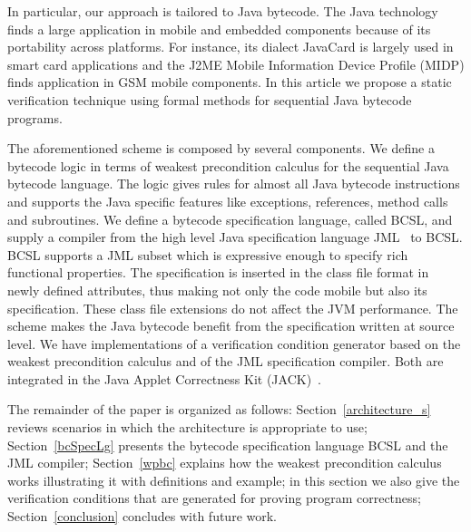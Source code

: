 
In particular, our approach is tailored to Java bytecode.
The Java technology finds a large application in mobile and embedded components because of its portability across platforms. 
For instance, its dialect JavaCard is largely used in smart card applications and the J2ME Mobile Information Device Profile (MIDP) finds application in GSM mobile components. 
In this article we propose a static verification technique using formal methods for sequential Java bytecode programs.

The aforementioned scheme is composed by several components.
We define a bytecode logic in terms of weakest precondition calculus for the sequential Java bytecode language. 
The logic gives rules for almost all Java bytecode instructions and supports the Java specific features like 
exceptions, references, method calls and subroutines.  
 We define a bytecode specification language, called BCSL, and supply a compiler from 
 the high level Java specification language JML~\cite{JMLRefMan} to BCSL. 
 BCSL supports a JML subset which is expressive enough to specify rich functional properties. The specification is 
 inserted in the class file format in newly defined attributes, thus making not only the code mobile but also its specification. These class
 file extensions do not affect the JVM performance. The scheme makes the Java bytecode benefit from the specification written at source level.
 We have implementations of a verification condition generator based on the weakest precondition calculus and of the JML specification compiler. Both are integrated in the Java Applet Correctness Kit (JACK)~\cite{BRL-JACK}. 


  
The remainder of the paper is organized as follows: 
Section~\ref{architecture_s} reviews scenarios in which the architecture is appropriate to use; 
 Section~\ref{bcSpecLg} presents the bytecode 
specification language BCSL and the JML compiler; Section~\ref{wpbc} explains how the weakest precondition calculus works illustrating it with definitions and example; in this section we also give the verification conditions that are generated for 
proving program correctness; %
Section~\ref{conclusion} concludes with future work.  















